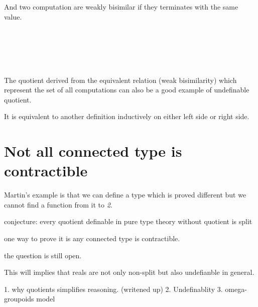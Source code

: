 And two computation are weakly bisimilar if they terminates with the
same value.

\begin{code}
\\
\>  \AgdaSymbol{\{} \AgdaSymbol{:} \AgdaSymbol{\}} \AgdaSymbol{:}        \<%
\\
\>[2]\<[4]%
\>[4] \<[11]%
\>[11]\AgdaSymbol{:}  \AgdaSymbol{\{}  \AgdaSymbol{\}}            \<%
\\
\>[2]\<[4]%
\>[4] \<[11]%
\>[11]\AgdaSymbol{:}  \AgdaSymbol{\{} \AgdaSymbol{\}} \AgdaSymbol{(} \AgdaSymbol{:}  \AgdaSymbol{((} \AgdaSymbol{)}  \AgdaSymbol{(} \AgdaSymbol{)))}  \AgdaSymbol{(} \AgdaSymbol{)}  \AgdaSymbol{(} \AgdaSymbol{)}\<%
\\
\end{code}


The quotient derived from the equivalent relation (weak bisimilarity) which represent
the set of all computations can also be a good
example of undefinable quotient.

It is equivalent to another definition inductively on either left side
or right side.


\section{Not all connected type is contractible}

Martin's example is that we can define a type which is proved
different but we cannot find a function from it to \emph{2}.


conjecture: every quotient definable in pure type theory without
quotient is split

one way to prove it is any connected type is contractible.

the question is still open.


This will implies that reals are not only non-split but also
undefianble in general.


1. why quotients simplifies reasoning. (writened up)
2. Undefinablity
3. omega-groupoids model
